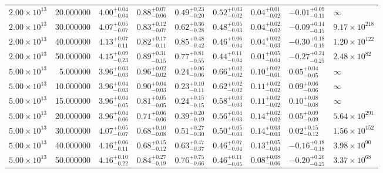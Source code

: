 \begin{tabular}{lrlllllll}
$2.00 \times 10^{13}$ & 20.000000 & $4.00^{+0.04}_{-0.04}$ & $0.88^{+0.07}_{-0.06}$ & $0.49^{+0.23}_{-0.20}$ & $0.52^{+0.03}_{-0.02}$ & $0.04^{+0.01}_{-0.02}$ & $-0.01^{+0.09}_{-0.11}$ & $\infty$ \\
$2.00 \times 10^{13}$ & 30.000000 & $4.07^{+0.05}_{-0.07}$ & $0.83^{+0.12}_{-0.07}$ & $0.62^{+0.36}_{-0.28}$ & $0.48^{+0.05}_{-0.03}$ & $0.04^{+0.02}_{-0.02}$ & $-0.09^{+0.14}_{-0.15}$ & $9.17 \times 10^{218}$ \\
$2.00 \times 10^{13}$ & 40.000000 & $4.13^{+0.07}_{-0.11}$ & $0.82^{+0.17}_{-0.11}$ & $0.85^{+0.48}_{-0.42}$ & $0.46^{+0.06}_{-0.04}$ & $0.04^{+0.02}_{-0.03}$ & $-0.30^{+0.18}_{-0.19}$ & $1.20 \times 10^{122}$ \\
$2.00 \times 10^{13}$ & 50.000000 & $4.15^{+0.09}_{-0.23}$ & $0.89^{+0.31}_{-0.15}$ & $0.77^{+0.81}_{-0.55}$ & $0.44^{+0.11}_{-0.04}$ & $0.01^{+0.05}_{-0.04}$ & $-0.27^{+0.24}_{-0.25}$ & $2.48 \times 10^{82}$ \\
$5.00 \times 10^{13}$ & 5.000000 & $3.96^{+0.03}_{-0.03}$ & $0.96^{+0.02}_{-0.02}$ & $0.24^{+0.06}_{-0.06}$ & $0.66^{+0.02}_{-0.02}$ & $0.10^{+0.02}_{-0.01}$ & $0.05^{+0.04}_{-0.05}$ & $\infty$ \\
$5.00 \times 10^{13}$ & 10.000000 & $3.96^{+0.04}_{-0.03}$ & $0.90^{+0.04}_{-0.03}$ & $0.23^{+0.10}_{-0.11}$ & $0.62^{+0.02}_{-0.02}$ & $0.11^{+0.02}_{-0.02}$ & $0.09^{+0.06}_{-0.06}$ & $\infty$ \\
$5.00 \times 10^{13}$ & 15.000000 & $3.96^{+0.04}_{-0.05}$ & $0.81^{+0.05}_{-0.05}$ & $0.24^{+0.15}_{-0.15}$ & $0.58^{+0.03}_{-0.03}$ & $0.11^{+0.02}_{-0.02}$ & $0.10^{+0.08}_{-0.08}$ & $\infty$ \\
$5.00 \times 10^{13}$ & 20.000000 & $3.96^{+0.04}_{-0.06}$ & $0.71^{+0.06}_{-0.06}$ & $0.39^{+0.20}_{-0.19}$ & $0.56^{+0.04}_{-0.03}$ & $0.14^{+0.02}_{-0.02}$ & $0.05^{+0.09}_{-0.09}$ & $5.64 \times 10^{291}$ \\
$5.00 \times 10^{13}$ & 30.000000 & $4.07^{+0.05}_{-0.07}$ & $0.68^{+0.10}_{-0.08}$ & $0.51^{+0.27}_{-0.30}$ & $0.50^{+0.05}_{-0.03}$ & $0.14^{+0.03}_{-0.03}$ & $0.02^{+0.15}_{-0.12}$ & $1.56 \times 10^{152}$ \\
$5.00 \times 10^{13}$ & 40.000000 & $4.16^{+0.06}_{-0.11}$ & $0.68^{+0.15}_{-0.12}$ & $0.63^{+0.47}_{-0.37}$ & $0.46^{+0.07}_{-0.04}$ & $0.13^{+0.05}_{-0.04}$ & $-0.16^{+0.18}_{-0.18}$ & $3.98 \times 10^{90}$ \\
$5.00 \times 10^{13}$ & 50.000000 & $4.16^{+0.10}_{-0.22}$ & $0.84^{+0.27}_{-0.19}$ & $0.76^{+0.75}_{-0.66}$ & $0.46^{+0.11}_{-0.05}$ & $0.08^{+0.08}_{-0.06}$ & $-0.20^{+0.26}_{-0.25}$ & $3.37 \times 10^{68}$ \\

\end{tabular}
